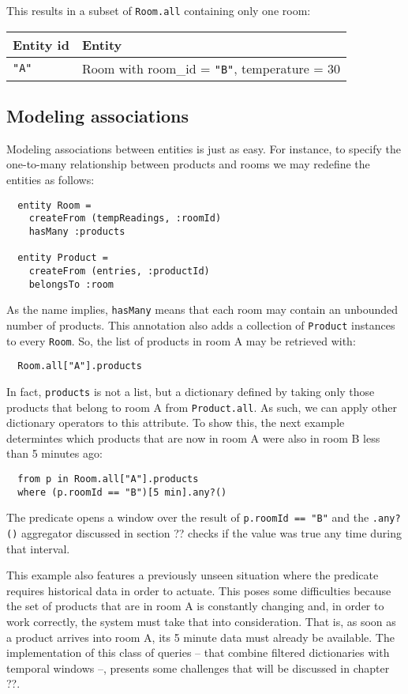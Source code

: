 \documentclass[a4,11pt]{report}
\begin{document}
This results in a subset of \verb=Room.all= containing only one room:

\begin{tabular}{ |l|l| }
  \hline
  Entity id & Entity \\
  \hline
  \verb="A"= & Room with room\_id = \verb="B"=, temperature = 30 \\
  \hline
\end{tabular}

\subsection{Modeling associations}

Modeling associations between entities is just as easy. For instance,
to specify the one-to-many relationship between products and rooms we
may redefine the entities as follows:

\begin{lstlisting}
  entity Room =
    createFrom (tempReadings, :roomId)
    hasMany :products

  entity Product =
    createFrom (entries, :productId)
    belongsTo :room
\end{lstlisting}

As the name implies, \verb=hasMany= means that each room may contain
an unbounded number of products. This annotation also adds a
collection of \verb=Product= instances to every \verb=Room=. So, the
list of products in room A may be retrieved with:

\begin{lstlisting}
  Room.all["A"].products
\end{lstlisting}

In fact, \verb=products= is not a list, but a dictionary defined by
taking only those products that belong to room A from
\verb=Product.all=. As such, we can apply other dictionary operators
to this attribute. To show this, the next example determintes which
products that are now in room A were also in room B less than 5
minutes ago:

\begin{lstlisting}
  from p in Room.all["A"].products
  where (p.roomId == "B")[5 min].any?()
\end{lstlisting}

The predicate opens a window over the result of \verb!p.roomId == "B"!
and the \verb=.any?()= aggregator discussed in section ?? checks if
the value was true any time during that interval.

This example also features a previously unseen situation where the
predicate requires historical data in order to actuate. This poses
some difficulties because the set of products that are in room A is
constantly changing and, in order to work correctly, the system must
take that into consideration. That is, as soon as a product arrives
into room A, its 5 minute data must already be available. The
implementation of this class of queries -- that combine filtered
dictionaries with temporal windows --, presents some challenges that
will be discussed in chapter ??.
\end{document}
